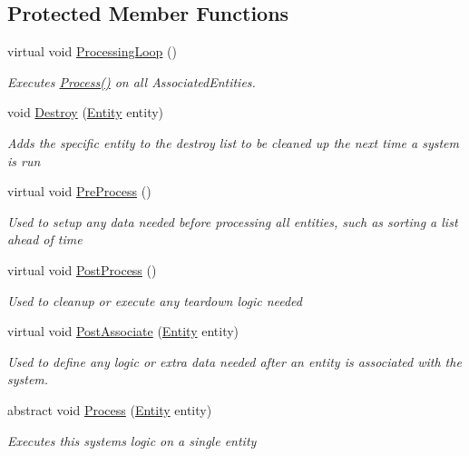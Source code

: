 \subsection*{Protected Member Functions}
\begin{DoxyCompactItemize}
\item 
virtual void \hyperlink{class_m_b2_d_1_1_entity_component_1_1_entity_system_a75552787342e68c427bf2e1ffa60ed6c}{Processing\+Loop} ()
\begin{DoxyCompactList}\small\item\em Executes \hyperlink{class_m_b2_d_1_1_entity_component_1_1_entity_system_abbf83b87cb5d12754fb058cef50451fa}{Process()} on all Associated\+Entities. \end{DoxyCompactList}\item 
void \hyperlink{class_m_b2_d_1_1_entity_component_1_1_entity_system_a86f27e2e12da562903092d5afb9dd70d}{Destroy} (\hyperlink{class_m_b2_d_1_1_entity_component_1_1_entity}{Entity} entity)
\begin{DoxyCompactList}\small\item\em Adds the specific entity to the destroy list to be cleaned up the next time a system is run \end{DoxyCompactList}\item 
virtual void \hyperlink{class_m_b2_d_1_1_entity_component_1_1_entity_system_aadc002dd04d9cb75775ca955a28e303e}{Pre\+Process} ()
\begin{DoxyCompactList}\small\item\em Used to setup any data needed before processing all entities, such as sorting a list ahead of time \end{DoxyCompactList}\item 
virtual void \hyperlink{class_m_b2_d_1_1_entity_component_1_1_entity_system_aa215c796a01092b66eb70c5726dfac75}{Post\+Process} ()
\begin{DoxyCompactList}\small\item\em Used to cleanup or execute any teardown logic needed \end{DoxyCompactList}\item 
virtual void \hyperlink{class_m_b2_d_1_1_entity_component_1_1_entity_system_ae8d1330e220d3ae7c8f6640c5d4aacd0}{Post\+Associate} (\hyperlink{class_m_b2_d_1_1_entity_component_1_1_entity}{Entity} entity)
\begin{DoxyCompactList}\small\item\em Used to define any logic or extra data needed after an entity is associated with the system. \end{DoxyCompactList}\item 
abstract void \hyperlink{class_m_b2_d_1_1_entity_component_1_1_entity_system_abbf83b87cb5d12754fb058cef50451fa}{Process} (\hyperlink{class_m_b2_d_1_1_entity_component_1_1_entity}{Entity} entity)
\begin{DoxyCompactList}\small\item\em Executes this systems logic on a single entity \end{DoxyCompactList}\end{DoxyCompactItemize}
